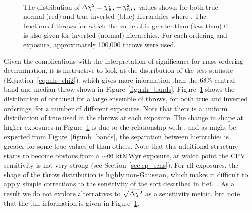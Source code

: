 \begin{figure*}[htbp]
  \centering
  \\
  \caption{The distribution of $\Delta\chi^{2} = \chi^{2}_{\mathrm{IO}} - \chi^{2}_{\mathrm{NO}}$ values shown for both true normal (red) and true inverted (blue) hierarchies where . The fraction of throws for which the value of \dchisq is greater than (less than) 0 is also given for inverted (normal) hierarchies. For each ordering and exposure, approximately 100,000 throws were used.}
  \label{fig:mh_comp_over_time}
\end{figure*}
Given the complications with the interpretation of significance for mass ordering determination, it is instructive to look at the distribution of the test-statistic (Equation~\ref{eq:mh_chi2}), which gives more information than the 68\% central band and median throw shown in Figure~\ref{fig:mh_bands}. Figure~\ref{fig:mh_comp_over_time} shows the distribution of \dchisq obtained for a large ensemble of throws, for both true and inverted orderings, for a number of different exposures. Note that there is a uniform distribution of true \deltacp used in the throws at each exposure. The change in shape at higher exposures in Figure~\ref{fig:mh_comp_over_time} is due to the relationship with \deltacp, and as might be expected from Figure~\ref{fig:mh_bands}, the separation between hierarchies is greater for some true values of \deltacp than others. Note that this additional structure starts to become obvious from a $\sim$66 ktMWyr exposure, at which point the CPV sensitivity is not very strong (see Section~\ref{sec:cp_sens}). For all exposures, the shape of the throw distribution is highly non-Gaussian, which makes it difficult to apply simple corrections to the sensitivity of the sort described in Ref.~\cite{Blennow:2013oma}. As a result we do not explore alternatives to $\sqrt{\Delta\chi^{2}}$ as a sensitivity metric, but note that the full information is given in Figure~\ref{fig:mh_comp_over_time}.

